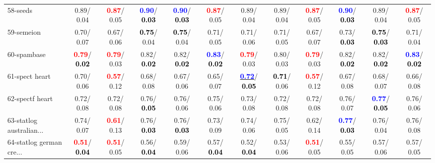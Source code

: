 \begin{table}[h]
\begin{center}
{\begin{tabular}{lc|c|c|c|c|c|c|c|c|c|c}
58-seeds &   0.89/  0.04 & \textcolor{red}{\textbf{  0.87}}/  0.05 & \textcolor{blue}{\textbf{  0.90}}/\textcolor{black}{\textbf{  0.03}} & \textcolor{blue}{\textbf{  0.90}}/\textcolor{black}{\textbf{  0.03}} & \textcolor{red}{\textbf{  0.87}}/  0.05 &   0.89/  0.04 &   0.89/  0.04 & \textcolor{red}{\textbf{  0.87}}/  0.05 & \textcolor{blue}{\textbf{  0.90}}/\textcolor{black}{\textbf{  0.03}} &   0.89/  0.04 & \textcolor{red}{\textbf{  0.87}}/  0.05 \\
59-semeion &   0.70/  0.07 &   0.67/  0.06 & \textcolor{black}{\textbf{  0.75}}/  0.04 & \textcolor{black}{\textbf{  0.75}}/  0.04 &   0.71/  0.05 &   0.71/  0.06 &   0.71/  0.05 &   0.67/  0.07 &   0.73/\textcolor{black}{\textbf{  0.03}} & \textcolor{black}{\textbf{  0.75}}/\textcolor{black}{\textbf{  0.03}} &   0.71/  0.04 \\
60-spambase & \textcolor{red}{\textbf{  0.79}}/\textcolor{black}{\textbf{  0.02}} & \textcolor{red}{\textbf{  0.79}}/  0.03 &   0.82/\textcolor{black}{\textbf{  0.02}} &   0.82/\textcolor{black}{\textbf{  0.02}} & \textcolor{blue}{\textbf{  0.83}}/\textcolor{black}{\textbf{  0.02}} & \textcolor{red}{\textbf{  0.79}}/  0.03 &   0.80/  0.03 & \textcolor{red}{\textbf{  0.79}}/  0.03 &   0.82/\textcolor{black}{\textbf{  0.02}} &   0.82/\textcolor{black}{\textbf{  0.02}} & \textcolor{blue}{\textbf{  0.83}}/\textcolor{black}{\textbf{  0.02}} \\ \hline
61-spect heart &   0.70/  0.06 & \textcolor{red}{\textbf{  0.57}}/  0.12 &   0.68/  0.08 &   0.67/  0.06 &   0.65/  0.07 & \underline{\textcolor{blue}{\textbf{  0.72}}}/\textcolor{black}{\textbf{  0.05}} & \textcolor{black}{\textbf{  0.71}}/  0.06 & \textcolor{red}{\textbf{  0.57}}/  0.12 &   0.67/  0.08 &   0.68/  0.07 &   0.66/  0.08 \\
62-spectf heart &   0.72/  0.08 &   0.72/  0.08 &   0.76/\textcolor{black}{\textbf{  0.05}} &   0.76/  0.06 &   0.75/  0.06 &   0.73/  0.08 &   0.72/  0.08 &   0.72/  0.08 &   0.76/  0.07 & \textcolor{blue}{\textbf{  0.77}}/\textcolor{black}{\textbf{  0.05}} &   0.76/  0.06 \\
63-statlog australian... &   0.74/  0.07 & \textcolor{red}{\textbf{  0.61}}/  0.13 &   0.76/\textcolor{black}{\textbf{  0.03}} &   0.76/\textcolor{black}{\textbf{  0.03}} &   0.73/  0.09 &   0.74/  0.06 &   0.75/  0.05 &   0.62/  0.14 & \textcolor{blue}{\textbf{  0.77}}/\textcolor{black}{\textbf{  0.03}} &   0.76/  0.04 &   0.76/  0.08 \\
64-statlog german cre... & \textcolor{red}{\textbf{  0.51}}/\textcolor{black}{\textbf{  0.04}} & \textcolor{red}{\textbf{  0.51}}/  0.05 &   0.56/\textcolor{black}{\textbf{  0.04}} &   0.59/  0.06 &   0.57/\textcolor{black}{\textbf{  0.04}} &   0.52/\textcolor{black}{\textbf{  0.04}} &   0.53/  0.06 & \textcolor{red}{\textbf{  0.51}}/  0.05 &   0.55/  0.05 &   0.57/  0.06 &   0.57/  0.05 \\\end{tabular}}\label{stratsBalAcc1bNB}
\end{center}
\end{table}
